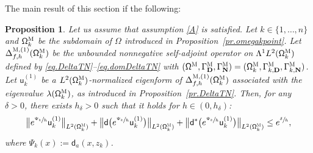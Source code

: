\documentclass[10pt]{amsart}
\newcommand{\mbf}[1]{\mathbf{#1}}
\theoremstyle{plain}
\newtheorem{proposition}{Proposition}
\theoremstyle{definition}
\begin{document}
The main result of this section if the following:

\skpt
\begin{proposition}
\label{pr.Agmon}
Let us assume that assumption \ref{A} is satisfied. Let
$k\in\{1,\ldots,n\}$ and $ \mathsf \Omega_k^{\textsc{M}} $ be the
subdomain of $\Omega$ introduced in Proposition~\ref{pr.omegakpoint}. Let $\Delta_{f,h}^{\textsc{M}, (1)}(\mathsf \Omega_k^{\textsc{M}})$ be the unbounded
nonnegative self-adjoint operator on
$ \Lambda^1L^{2} (\mathsf \Omega_k^{\textsc{M}})$ defined by \eqref{eq.DeltaTN}--\eqref{eq.domDeltaTN} with $(\mathsf \Omega^{\textsc{M}}, \Gamma^{\textsc{M}}_{\mbf D}, \Gamma^{\textsc{M}}_{\mbf N}) = (\mathsf \Omega_k^{\textsc{M}}, \Gamma_{k,\mbf D}^{\textsc{M}}, \Gamma_{k,\mbf N}^{\textsc{M}})$.
Let $\mathsf u^{(1)}_k$ be a $L^2(\mathsf
\Omega_k^{\textsc{M}})$-normalized eigenform of $
\Delta_{f,h}^{\textsc{M},(1)} (\mathsf \Omega_k^{\textsc{M}}) $
associated with the eigenvalue $\lambda(\mathsf
\Omega_k^{\textsc{M}})$, as introduced in Proposition~\ref{pr.DeltaTN}.
Then, for any $\delta>0$, there exists $h_\delta>0$ such that it holds for $h\in (0,h_\delta)$:
\[
\big\|e^{\sfrac{\Psi_k}{ h}} \mathsf u^{(1)}_k\big\|_{ L^{2} (\mathsf \Omega_k^{\textsc{M}})}
+\big\|\mathsf d \bigl(e^{\sfrac{ \Psi_k}{ h}} \mathsf u^{(1)}_k\bigr) \big\|_{ L^{2} (\mathsf \Omega_k^{\textsc{M}})}+\big\|\mathsf d^*\bigl(e^{\sfrac{ \Psi_k}{ h}} \mathsf u^{(1)}_k\bigr) \big\|_{ L^{2} (\mathsf \Omega_k^{\textsc{M}})}
\le e^{\sfrac \delta h},
\]
where $\Psi_k(x):=\mathsf d_a(x,z_k)$.
\end{proposition}
\end{document}
